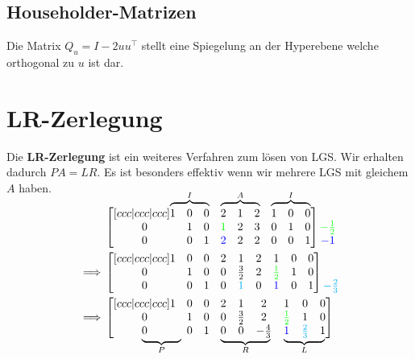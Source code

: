 \documentclass[a4paper,10pt]{article}
\newcommand\undermat[2]{%
  \makebox[0pt][l]{$\smash{\underbrace{\phantom{%
    \begin{matrix}#2\end{matrix}}}_{\text{$#1$}}}$}#2}
\newcommand\overmat[2]{%
  \makebox[0pt][l]{$\smash{\overbrace{\phantom{%
    \begin{matrix}#2\end{matrix}}}^{\text{$#1$}}}$}#2}
\begin{document}
\subsection{Householder-Matrizen}

Die Matrix $Q_u = I - 2uu^\top$ stellt eine Spiegelung an der Hyperebene welche orthogonal zu $u$ ist dar.

\section{LR-Zerlegung}

Die \textbf{LR-Zerlegung} ist ein weiteres Verfahren zum lösen von LGS. Wir erhalten dadurch $PA = LR$. Es ist besonders effektiv wenn wir mehrere LGS mit gleichem $A$ haben.

\begin{align*}
  & \begin{bmatrix}[ccc|ccc|ccc]
    \overmat{I}{1 & 0 & 0} & \overmat{A}{2 & 1 & 2} & \overmat{I}{1 & 0 & 0}\\
    0 & 1 & 0 & \textcolor{green}{1} & 2 & 3 & 0 & 1 & 0\\
    0 & 0 & 1 & \textcolor{blue}{2} & 2 & 2 & 0 & 0 & 1
  \end{bmatrix} \begin{matrix}
    \\
    \textcolor{green}{-\frac{1}{2}}\\
    \textcolor{blue}{-1}
  \end{matrix}\\
  \implies & \begin{bmatrix}[ccc|ccc|ccc]
    1 & 0 & 0 & 2 & 1 & 2 & 1 & 0 & 0\\
    0 & 1 & 0 & 0 & \frac{3}{2} & 2 & \textcolor{green}{\frac{1}{2}} & 1 & 0\\
    0 & 0 & 1 & 0 & \textcolor{cyan}{1} & 0 & \textcolor{blue}{1} & 0 & 1
  \end{bmatrix} \begin{matrix}
    \\
    \\
    \textcolor{cyan}{-\frac{2}{3}}
  \end{matrix}\\
  \implies & \begin{bmatrix}[ccc|ccc|ccc]
    1 & 0 & 0 & 2 & 1 & 2 & 1 & 0 & 0\\
    0 & 1 & 0 & 0 & \frac{3}{2} & 2 & \textcolor{green}{\frac{1}{2}} & 1 & 0\\
    \undermat{P}{0 & 0 & 1} & \undermat{R}{0 & 0 & -\frac{4}{3}} & \undermat{L}{\textcolor{blue}{1} & \textcolor{cyan}{\frac{2}{3}} & 1}
  \end{bmatrix}
\end{align*}\\
\end{document}
